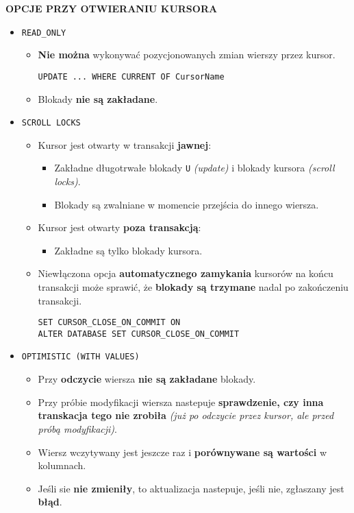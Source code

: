 \textbf{OPCJE PRZY OTWIERANIU KURSORA}
\begin{itemize}
    \item \texttt{READ\_ONLY}
    \begin{itemize}
        \item \textbf{Nie można} wykonywać pozycjonowanych zmian wierszy
        przez kursor.
        \begin{verbatim}
UPDATE ... WHERE CURRENT OF CursorName
        \end{verbatim}

        \item Blokady \textbf{nie są zakładane}.
    \end{itemize}

    \item \texttt{SCROLL LOCKS}
    \begin{itemize}
        \item Kursor jest otwarty w transakcji \textbf{jawnej}:
        \begin{itemize}
            \item Zakładne długotrwałe blokady \texttt{U} \textit{(update)}
            i blokady kursora \textit{(scroll locks)}.
            \item Blokady są zwalniane w momencie przejścia do innego
            wiersza.
        \end{itemize}

        \item Kursor jest otwarty \textbf{poza transakcją}:
        \begin{itemize}
            \item Zakładne są tylko blokady kursora.
        \end{itemize}

        \item Niewłączona opcja \textbf{automatycznego zamykania} kursorów
        na końcu transakcji może sprawić, że
        \textbf{blokady są trzymane} nadal po zakończeniu transakcji.

        \begin{verbatim}
SET CURSOR_CLOSE_ON_COMMIT ON
ALTER DATABASE SET CURSOR_CLOSE_ON_COMMIT
        \end{verbatim}
    \end{itemize}

    \item \texttt{OPTIMISTIC (WITH VALUES)}
    \begin{itemize}
        \item Przy \textbf{odczycie} wiersza \textbf{nie są zakładane}
        blokady.
        \item Przy próbie modyfikacji wiersza nastepuje
        \textbf{sprawdzenie, czy inna\\ transkacja tego nie zrobiła}
        \textit{(już po odczycie
        przez kursor, ale przed próbą modyfikacji)}.
        \item Wiersz wczytywany jest jeszcze raz i \textbf{porównywane są
        wartości} w kolumnach.
        \item Jeśli sie \textbf{nie zmieniły}, to aktualizacja nastepuje,
        jeśli nie, zgłaszany jest \textbf{błąd}.
    \end{itemize}


\end{itemize}
